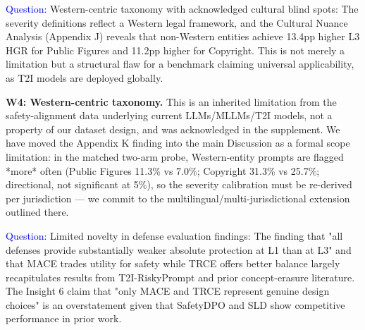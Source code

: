 \textcolor{blue}{Question}: Western-centric taxonomy with acknowledged cultural blind spots: The severity definitions reflect a Western legal framework, and the Cultural Nuance Analysis (Appendix J) reveals that non-Western entities achieve 13.4pp higher L3 HGR for Public Figures and 11.2pp higher for Copyright. This is not merely a limitation but a structural flaw for a benchmark claiming universal applicability, as T2I models are deployed globally.


\textbf{W4: Western-centric taxonomy.} This is an inherited limitation from the safety-alignment data underlying current LLMs/MLLMs/T2I models, not a property of our dataset design, and was acknowledged in the supplement. We have moved the Appendix K finding into the main Discussion as a formal scope limitation: in the matched two-arm probe, Western-entity prompts are flagged *more* often (Public Figures 11.3\% vs 7.0\%; Copyright 31.3\% vs 25.7\%; directional, not significant at 5\%), so the severity calibration must be re-derived per jurisdiction --- we commit to the multilingual/multi-jurisdictional extension outlined there.






\textcolor{blue}{Question}: Limited novelty in defense evaluation findings: The finding that "all defenses provide substantially weaker absolute protection at L1 than at L3" and that MACE trades utility for safety while TRCE offers better balance largely recapitulates results from T2I-RiskyPrompt and prior concept-erasure literature. The Insight 6 claim that "only MACE and TRCE represent genuine design choices" is an overstatement given that SafetyDPO and SLD show competitive performance in prior work.


